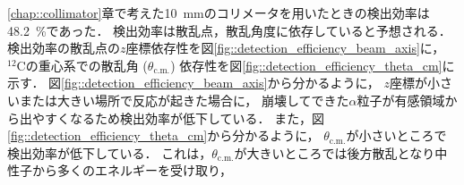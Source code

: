 \documentclass[../master]{subfiles}
\begin{document}
%
\ref{chap::collimator}章で考えた\SI{10}{\milli\metre}のコリメータを用いたときの検出効率は\SI{48.2}{\percent}であった．
検出効率は散乱点，散乱角度に依存していると予想される．
検出効率の散乱点の$z$座標依存性を図\ref{fig::detection_efficiency_beam_axis}に，
${}^{12}\mathrm{C}$の重心系での散乱角 ($\theta_{\text{c.m.}}$) 依存性を図\ref{fig::detection_efficiency_theta_cm}に示す．
図\ref{fig::detection_efficiency_beam_axis}から分かるように，
$z$座標が小さいまたは大きい場所で反応が起きた場合に，
崩壊してできた$\alpha$粒子が有感領域から出やすくなるため検出効率が低下している．
また，図\ref{fig::detection_efficiency_theta_cm}から分かるように，
$\theta_{\text{c.m.}}$が小さいところで検出効率が低下している．
これは，$\theta_{\text{c.m.}}$が大きいところでは後方散乱となり中性子から多くのエネルギーを受け取り，
\end{document}
